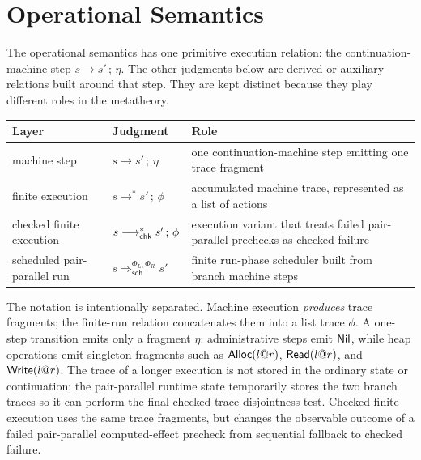\section{Operational Semantics}
\label{sec:opsem}

The operational semantics has one primitive execution relation: the
continuation-machine step $s\longrightarrow s'\,;\,\eta$.  The other judgments
below are derived or auxiliary relations built around that step.  They are
kept distinct because they play different roles in the metatheory.

\begin{center}
\small
\begin{tabular}{@{}>{\raggedright\arraybackslash}p{.18\linewidth}
                  >{\raggedright\arraybackslash}p{.33\linewidth}
                  >{\raggedright\arraybackslash}p{.39\linewidth}@{}}
\toprule
\textbf{Layer} & \textbf{Judgment} & \textbf{Role}\\
\midrule
machine step
  & $s\longrightarrow s'\,;\,\eta$
  & one continuation-machine step emitting one trace fragment\\
finite execution
  & $s\longrightarrow^{*}s'\,;\,\phi$
  & accumulated machine trace, represented as a list of actions\\
checked finite execution
  & $s\mathrel{\longrightarrow^{*}_{\mathsf{chk}}} s'\,;\,\phi$
  & execution variant that treats failed pair-parallel prechecks as checked failure\\
scheduled pair-parallel run
  & $s\Longrightarrow_{\mathsf{sch}}^{\Phi_L,\Phi_R}s'$
  & finite run-phase scheduler built from branch machine steps\\
\bottomrule
\end{tabular}
\end{center}

The notation is intentionally separated.  Machine execution \emph{produces}
trace fragments; the finite-run relation concatenates them into a list trace
$\phi$. A one-step transition emits only a fragment $\eta$:
administrative steps emit $\mathsf{Nil}$, while heap operations emit singleton
fragments such as $\mathsf{Alloc}(l\mathord{@} r)$, $\mathsf{Read}(l\mathord{@} r)$, and $\mathsf{Write}(l\mathord{@} r)$. The
trace of a longer execution is not stored in the ordinary state or continuation;
the pair-parallel runtime state temporarily stores the two branch traces so it
can perform the final checked trace-disjointness test.
Checked finite execution uses the same trace fragments, but changes the
observable outcome of a failed pair-parallel computed-effect precheck from
sequential fallback to checked failure.

